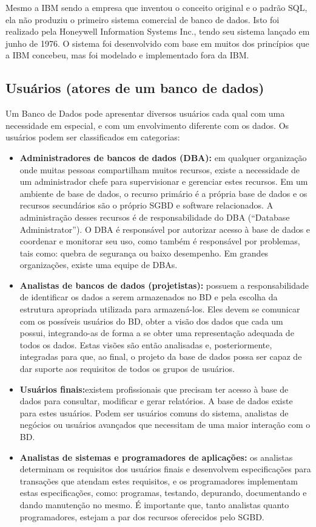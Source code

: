 \documentclass{article}
\begin{document}
Mesmo a IBM sendo a empresa que inventou o conceito original e o padrão SQL, ela não produziu o primeiro sistema comercial de banco de dados. Isto foi realizado pela Honeywell Information Systems Inc., tendo seu sistema lançado em junho de 1976. O sistema foi desenvolvido com base em muitos dos princípios que a IBM concebeu, mas foi modelado e implementado fora da IBM.

\subsection{Usuários (atores de um banco de dados)}
Um Banco de Dados pode apresentar diversos usuários cada qual com uma necessidade em especial, e com um envolvimento diferente com os dados. Os usuários podem ser classificados em categorias:
\begin{itemize}
    \item \textbf{Administradores de bancos de dados (DBA):} em qualquer organização onde muitas pessoas compartilham muitos recursos, existe a necessidade de um administrador chefe para supervisionar e gerenciar estes recursos. Em um ambiente de base de dados, o recurso primário é a própria base de dados e os recursos secundários são o próprio SGBD e software relacionados. A administração desses recursos é de responsabilidade do DBA (“Database Administrator”). O DBA é responsável por autorizar acesso à base de dados e coordenar e monitorar seu uso, como também é responsável por problemas, tais como: quebra de segurança ou baixo desempenho. Em grandes organizações, existe uma equipe de DBAs.
    \item \textbf{Analistas de bancos de dados (projetistas):} possuem a responsabilidade de identificar os dados a serem armazenados no BD e pela escolha da estrutura apropriada utilizada para armazená-los. Eles devem se comunicar com os possíveis usuários do BD, obter a visão dos dados que cada um possui, integrando-as de forma a se obter uma representação adequada de todos os dados. Estas visões são então analisadas e, posteriormente, integradas para que, ao final, o projeto da base de dados possa ser capaz de dar suporte aos requisitos de todos os grupos de usuários.
    \item \textbf{Usuários finais:}existem profissionais que precisam ter acesso à base de dados para consultar, modificar e gerar relatórios. A base de dados existe para estes usuários. Podem ser usuários comuns do sistema, analistas de negócios ou usuários avançados que necessitam de uma maior interação com o BD. 
    \item \textbf{Analistas de sistemas e programadores de aplicações: }os analistas determinam os requisitos dos usuários finais e desenvolvem especificações para transações que atendam estes requisitos, e os programadores implementam estas especificações, como: programas, testando, depurando, documentando e dando manutenção no mesmo. É importante que, tanto analistas quanto programadores, estejam a par dos recursos oferecidos pelo SGBD.
\end{itemize}
\end{document}
